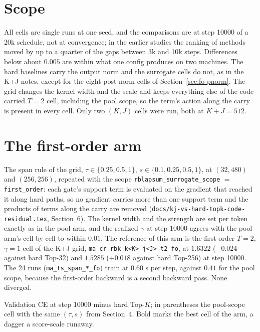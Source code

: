 \documentclass[11pt,a4paper]{article}
\newcommand{\code}[1]{\texttt{#1}}
\begin{document}
\section{Scope}

All cells are single runs at one seed, and the comparisons are at step
10000 of a 20k schedule, not at convergence; in the earlier studies the
ranking of methods moved by up to a quarter of the gaps between 3k and 10k
steps. Differences below about $0.005$ are within what one config produces
on two machines. The hard baselines carry the output norm and the surrogate
cells do not, as in the K+J notes, except for the eight post-norm cells of
Section~\ref{sec:fo-pnorm}. The grid changes the kernel width and the
scale and keeps everything else of the code-carried $T = 2$ cell, including
the pool scope, so the term's action along the carry is present in every
cell. Only two $(K, J)$ cells were run, both at $K + J = 512$.

\section{The first-order arm}
\label{sec:fo}

The span rule of the grid, $\tau \in \{0.25, 0.5, 1\}$, $s \in \{0.1, 0.25,
0.5, 1\}$, at $(32, 480)$ and $(256, 256)$, repeated with the scope
\code{rblapsum\_surrogate\_scope} $=$ \code{first\_order}: each gate's support
term is evaluated on the gradient that reached it along hard paths, so no
gradient carries more than one support term and the products of terms along
the carry are removed (\code{docs/kj-vs-hard-topk-code-residual.tex},
Section~6). The kernel width and the strength are set per token exactly as in
the pool arm, and the realized $\gamma$ at step 10000 agrees with the pool
arm's cell by cell to within $0.01$. The reference of this arm is the
first-order $T = 2$, $\gamma = 1$ cell of the K+J grid,
\code{ma\_cr\_rbk\_k<K>\_j<J>\_t2\_fo}, at $1.6322$ ($-0.024$ against hard
Top-32) and $1.5285$ ($+0.018$ against hard Top-256) at step 10000. The 24
runs (\code{ma\_ts\_span\_*\_fo}) train at $0.60$ s per step, against $0.41$
for the pool scope, because the first-order backward is a second backward
pass. None diverged.

Validation CE at step 10000 minus hard Top-$K$; in parentheses the
pool-scope cell with the same $(\tau, s)$ from Section~4. Bold marks the best
cell of the arm, a dagger a score-scale runaway.
\end{document}
